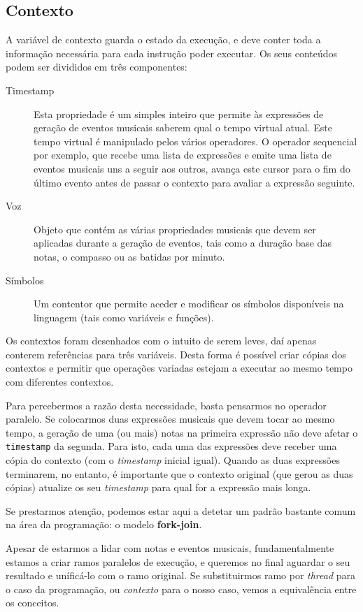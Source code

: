 \subsection{Contexto}
A variável de contexto guarda o estado da execução, e deve conter toda a informação necessária para cada instrução poder executar. Os seus conteúdos podem ser divididos em três componentes:
\begin{description}
 \item[Timestamp] Esta propriedade é um simples inteiro que permite às expressões de geração de eventos musicais saberem qual o tempo virtual atual. Este tempo virtual é manipulado pelos vários operadores. O operador sequencial por exemplo, que recebe uma lista de expressões e emite uma lista de eventos musicais uns a seguir aos outros, avança este cursor para o fim do último evento antes de passar o contexto para avaliar a expressão seguinte.
 \item[Voz] Objeto que contém as várias propriedades musicais que devem ser aplicadas durante a geração de eventos, tais como a duração base das notas, o compasso ou as batidas por minuto.
 \item[Símbolos] Um contentor que permite aceder e modificar os símbolos disponíveis na linguagem (tais como variáveis e funções).
 \end{description}
 
 Os contextos foram desenhados com o intuito de serem leves, daí apenas conterem  referências para três variáveis. Desta forma é possível criar cópias dos contextos e permitir que operações variadas estejam a executar ao mesmo tempo com diferentes contextos.
 
 Para percebermos a razão desta necessidade, basta pensarmos no operador paralelo. Se colocarmos duas expressões musicais que devem tocar ao mesmo tempo, a geração de uma (ou mais) notas na primeira expressão não deve afetar o \texttt{timestamp} da segunda. Para isto, cada uma das expressões deve receber uma cópia do contexto (com o \textit{timestamp} inicial igual). Quando as duas expressões terminarem, no entanto, é importante que o contexto original (que gerou as duas cópias) atualize os seu \textit{timestamp} para qual for a expressão mais longa.
 
 Se prestarmos atenção, podemos estar aqui a detetar um padrão bastante comum na área da programação: o modelo \textbf{fork-join}.
 
 Apesar de estarmos a lidar com notas e eventos musicais, fundamentalmente estamos a criar ramos paralelos de execução, e queremos no final aguardar o seu resultado e uníficá-lo com o ramo original. Se substituirmos ramo por \textit{thread} para o caso da programação, ou \textit{contexto} para o nosso caso, vemos a equivalência entre os conceitos.
 
